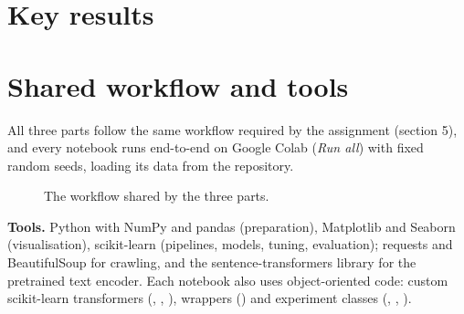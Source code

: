 \documentclass[11pt,a4paper,openany]{report}
\begin{document}
\section{Key results}
\begin{table}[H]\centering\small
\caption{Headline result of each part on its held-out test set.}\label{ov:tab-results}

\end{table}

\section{Shared workflow and tools}
All three parts follow the same workflow required by the assignment (section 5), and every notebook runs end-to-end on Google
Colab (\emph{Run all}) with fixed random seeds, loading its data from the repository.

\begin{figure}[H]\centering
{}
\caption{The workflow shared by the three parts.\label{ov:fig-workflow}}
\end{figure}

\textbf{Tools.} Python with NumPy and pandas (preparation), Matplotlib and Seaborn (visualisation), scikit-learn (pipelines,
models, tuning, evaluation); requests and BeautifulSoup for crawling, and the sentence-transformers library for the
pretrained text encoder. Each notebook also uses object-oriented code: custom scikit-learn transformers (,
, ), wrappers () and experiment classes
(, , ).
\end{document}
